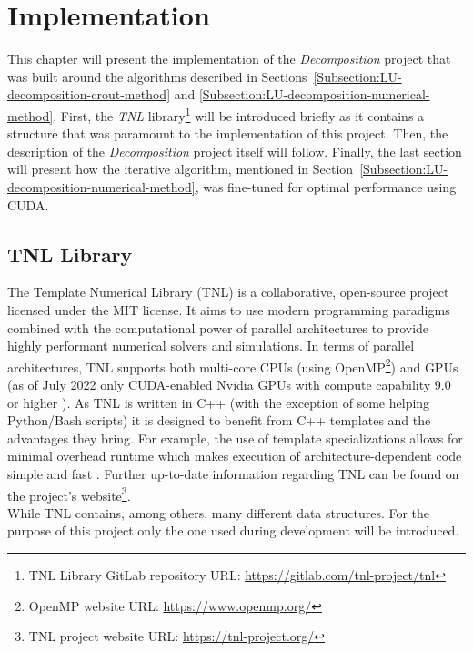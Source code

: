 \chapter{Implementation \TO}\label{Chapter:implementation-introduction}
This chapter will present the implementation of the \textit{Decomposition} project that was built around the algorithms described in Sections~\ref{Subsection:LU-decomposition-crout-method} and \ref{Subsection:LU-decomposition-numerical-method}. First, the \textit{TNL} library\footnote{TNL Library GitLab repository URL: \url{https://gitlab.com/tnl-project/tnl}} will be introduced briefly as it contains a structure that was paramount to the implementation of this project. Then, the description of the \textit{Decomposition} project itself will follow. Finally, the last section will present how the iterative algorithm, mentioned in Section~\ref{Subsection:LU-decomposition-numerical-method}, was fine-tuned for optimal performance using CUDA.

\section{TNL Library \TO}\label{Section:implementation-tnl-library}
The Template Numerical Library (TNL) is a collaborative, open-source project licensed under the MIT license. It aims to use modern programming paradigms combined with the computational power of parallel architectures to provide highly performant numerical solvers and simulations. In terms of parallel architectures, TNL supports both multi-core CPUs (using OpenMP\footnote{OpenMP website URL: \url{https://www.openmp.org/}}) and GPUs (as of July 2022 only CUDA-enabled Nvidia GPUs with compute capability 9.0 or higher \cite{Ednu6dyrkWKz1Bv2}). As TNL is written in C++ (with the exception of some helping Python/Bash scripts) it is designed to benefit from C++ templates and the advantages they bring. For example, the use of template specializations allows for minimal overhead runtime which makes execution of architecture-dependent code simple and fast \cite{Oberhuber20210210}. Further up-to-date information regarding TNL can be found on the project's website\footnote{TNL project website URL: \url{https://tnl-project.org/}}. \\
While TNL contains, among others, many different data structures. For the purpose of this project only the one used during development will be introduced.

